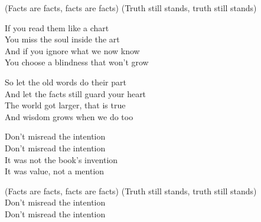 \begin{lyrics}
(Facts are facts, facts are facts)
(Truth still stands, truth still stands)

If you read them like a chart\\
You miss the soul inside the art\\
And if you ignore what we now know\\
You choose a blindness that won’t grow

So let the old words do their part\\
And let the facts still guard your heart\\
The world got larger, that is true\\
And wisdom grows when we do too

Don’t misread the intention\\
Don’t misread the intention\\
It was not the book’s invention\\
It was value, not a mention

(Facts are facts, facts are facts)
(Truth still stands, truth still stands)\\
Don’t misread the intention\\
Don’t misread the intention
\end{lyrics}

